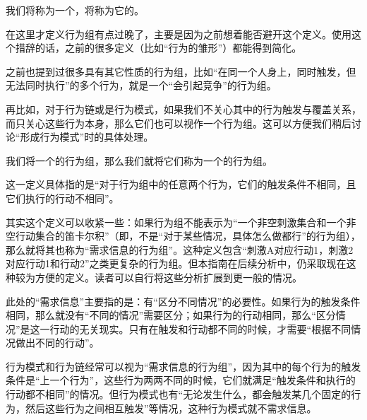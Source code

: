 \noindent 我们将称为一个，将称为它的。
\begin{explain}
在这里才定义行为组有点过晚了，主要是因为之前想着能否避开这个定义。使用这个措辞的话，之前的很多定义（比如“行为的雏形”）都能得到简化。

之前也提到过很多具有其它性质的行为组，比如“在同一个人身上，同时触发，但无法同时执行”的多个行为，就是一个“会引起竞争”的行为组。

再比如，对于行为链或是行为模式，如果我们不关心其中的行为触发与覆盖关系，而只关心这些行为本身，那么它们也可以视作一个行为组。这可以方便我们稍后讨论“形成行为模式”时的具体处理。
\end{explain}
我们将一个的行为组，那么我们就将它们称为一个的行为组。
\begin{explain}
这一定义具体指的是“对于行为组中的任意两个行为，它们的触发条件不相同，且它们执行的行动不相同”。

其实这个定义可以收紧一些：如果行为组不能表示为“一个非空刺激集合和一个非空行动集合的笛卡尔积”（即，不是“对于某些情况，具体怎么做都行”的行为组），那么就将其也称为“需求信息的行为组”。这种定义包含“刺激A对应行动1，刺激2对应行动1和行动2”之类更复杂的行为组。但本指南在后续分析中，仍采取现在这种较为方便的定义。读者可以自行将这些分析扩展到更一般的情况。

此处的“需求信息”主要指的是：有“区分不同情况”的必要性。如果行为的触发条件相同，那么就没有“不同的情况”需要区分；如果行为的行动相同，那么“区分情况”是这一行动的无关现实。只有在触发和行动都不同的时候，才需要“根据不同情况做出不同的行动”。

行为模式和行为链经常可以视为“需求信息的行为组”，因为其中的每个行为的触发条件是“上一个行为”，这些行为两两不同的时候，它们就满足“触发条件和执行的行动都不相同”的情况。但行为模式也有“无论发生什么，都会触发某几个固定的行为，然后这些行为之间相互触发”等情况，这种行为模式就不需求信息。
\end{explain}
